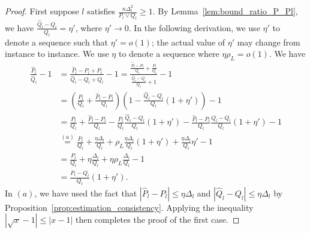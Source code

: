 \documentclass{article}
\begin{document}
\begin{proof}
First suppose $l$ satisfies $\frac{n \Delta_l^2}{P_l \vee Q_l} \geq 1$. By Lemma~\ref{lem:bound_ratio_P_Pl}, we have $ \frac{\hat{Q}_l - Q_l}{Q_l} = \eta'$, where $\eta' \rightarrow 0$. In the following derivation, we use $\eta'$ to denote a sequence such that $\eta' = o(1)$; the actual value of $\eta'$ may change from instance to instance. We use $\eta$ to denote a sequence where $\eta \rho_L = o(1)$. We have
\begin{align*}
\frac{\hat{P}_l}{\hat{Q}_l} - 1&= 
      \frac{ \hat{P}_l - P_l + P_l }{ \hat{Q}_l - Q_l + Q_l} -1 = \frac{  \frac{\hat{P}_l - P_l}{Q_l} + \frac{P_l}{Q_l}}
       { \frac{\hat{Q}_l - Q_l}{Q_l} + 1} - 1 \\
 &= \left( \frac{P_l}{Q_l} + \frac{\hat{P}_l - P_l}{Q_l} \right)
    \left( 1 - \frac{\hat{Q}_l - Q_l}{Q_l} (1 + \eta')  \right) -1  \\
 &= \frac{P_l}{Q_l} + \frac{\hat{P}_l - P_l}{Q_l} 
     - \frac{P_l}{Q_l} \frac{\hat{Q}_l - Q_l}{Q_l} (1 + \eta') 
     - \frac{\hat{P}_l - P_l}{Q_l} \frac{\hat{Q}_l - Q_l}{Q_l}(1+ \eta') 
   - 1 \\
 &\stackrel{(a)}= \frac{P_l}{Q_l} + \frac{\eta \Delta_l}{Q_l} 
     + \rho_L \frac{\eta \Delta_l}{Q_l} (1+\eta') + \frac{\eta \Delta_l}{Q_l} \eta' 
   - 1 \\
 &= \frac{P_l}{Q_l} + \eta \frac{\Delta_l}{Q_l}
     + \eta \rho_L \frac{\Delta_l}{Q_l}
   - 1 \\
 &= \frac{P_l - Q_l}{Q_l} ( 1 + \eta').
\end{align*}
In $(a)$, we have used the fact that $| \hat{P}_l - P_l| \leq \eta \Delta_l$ and $| \hat{Q}_l - Q_l| \leq \eta \Delta_l$ by Proposition~\ref{prop:estimation_consistency}. Applying the inequality $|\sqrt{x} - 1| \leq |x-1|$ then completes the proof of the first case.


\end{proof}
\end{document}

